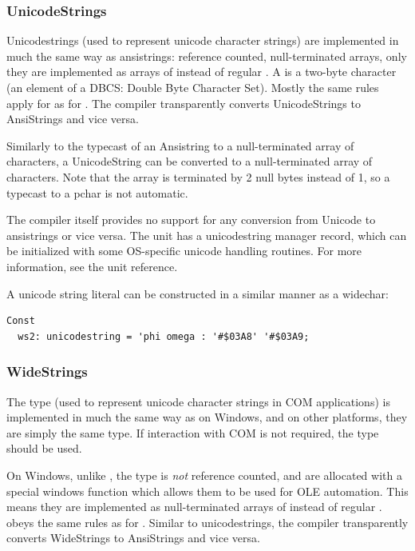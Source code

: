 \subsubsection{UnicodeStrings}
Unicodestrings (used to represent unicode character strings) are implemented in much
the same way as ansistrings: reference counted, null-terminated arrays, only they
are implemented as arrays of  instead of regular .
A  is a two-byte character (an element of a DBCS: Double Byte
Character Set). Mostly the same rules apply for  as for
. The compiler transparently converts UnicodeStrings to
AnsiStrings and vice versa. 

Similarly to the typecast of an Ansistring to a  null-terminated
 array of characters, a UnicodeString can be converted to a
 null-terminated array of characters. Note that the
 array is terminated by 2 null bytes instead of
1, so a typecast to a pchar is not automatic.

The compiler itself provides no support for any conversion from Unicode to
ansistrings or vice versa. The  unit has a unicodestring manager
record, which can be initialized with some OS-specific unicode handling
routines. For more information, see the  unit reference.

A unicode string literal can be constructed in a similar manner as a widechar:
\begin{verbatim}
Const
  ws2: unicodestring = 'phi omega : '#$03A8' '#$03A9;
\end{verbatim}


\subsubsection{WideStrings}
The  type (used to represent unicode character strings in COM applications)
is implemented in much the same way as  on Windows, and on other
platforms, they are simply the same type. If interaction with COM is not required,
the  type should be used.

On Windows, unlike , the  type is \emph{not} reference counted,
and are allocated with a special windows function which allows them to be used for OLE automation.
This means they are implemented as null-terminated arrays of  instead of regular .
 obeys the same rules as for .
Similar to unicodestrings, the compiler transparently converts WideStrings
to AnsiStrings and vice versa. 

